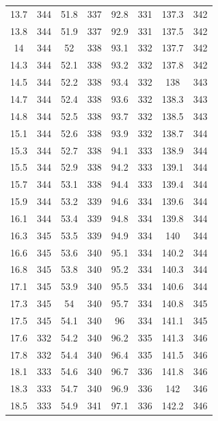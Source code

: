 \documentclass[12pt]{ctexart}
\numberwithin{equation}{section}
\begin{document}
\begin{longtable}{cc|cc|cc|cc}
13.7  &  344  &  51.8  &  337  &  92.8  &  331  &  137.3  &  342  \\
13.8  &  344  &  51.9  &  337  &  92.9  &  331  &  137.5  &  342  \\
14  &  344  &  52  &  338  &  93.1  &  332  &  137.7  &  342  \\
14.3  &  344  &  52.1  &  338  &  93.2  &  332  &  137.8  &  342  \\
14.5  &  344  &  52.2  &  338  &  93.4  &  332  &  138  &  343  \\
14.7  &  344  &  52.4  &  338  &  93.6  &  332  &  138.3  &  343  \\
14.8  &  344  &  52.5  &  338  &  93.7  &  332  &  138.5  &  343  \\
15.1  &  344  &  52.6  &  338  &  93.9  &  332  &  138.7  &  344  \\
15.3  &  344  &  52.7  &  338  &  94.1  &  333  &  138.9  &  344  \\
15.5  &  344  &  52.9  &  338  &  94.2  &  333  &  139.1  &  344  \\
15.7  &  344  &  53.1  &  338  &  94.4  &  333  &  139.4  &  344  \\
15.9  &  344  &  53.2  &  339  &  94.6  &  334  &  139.6  &  344  \\
16.1  &  344  &  53.4  &  339  &  94.8  &  334  &  139.8  &  344  \\
16.3  &  345  &  53.5  &  339  &  94.9  &  334  &  140  &  344  \\
16.6  &  345  &  53.6  &  340  &  95.1  &  334  &  140.2  &  344  \\
16.8  &  345  &  53.8  &  340  &  95.2  &  334  &  140.3  &  344  \\
17.1  &  345  &  53.9  &  340  &  95.5  &  334  &  140.6  &  344  \\
17.3  &  345  &  54  &  340  &  95.7  &  334  &  140.8  &  345  \\
17.5  &  345  &  54.1  &  340  &  96  &  334  &  141.1  &  345  \\
17.6  &  332  &  54.2  &  340  &  96.2  &  335  &  141.3  &  346  \\
17.8  &  332  &  54.4  &  340  &  96.4  &  335  &  141.5  &  346  \\
18.1  &  333  &  54.6  &  340  &  96.7  &  336  &  141.8  &  346  \\
18.3  &  333  &  54.7  &  340  &  96.9  &  336  &  142  &  346  \\
18.5  &  333  &  54.9  &  341  &  97.1  &  336  &  142.2  &  346  \\

\end{longtable}
\end{document}
